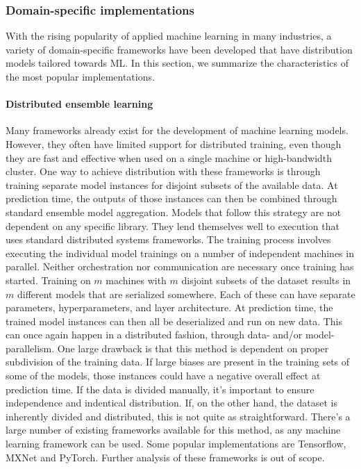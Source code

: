 \subsubsection{Domain-specific implementations}

With the rising popularity of applied machine learning in many industries, a variety of domain-specific frameworks have been developed that have distribution models tailored towards ML. In this section, we summarize the characteristics of the most popular implementations.

\paragraph{Distributed ensemble learning}
Many frameworks already exist for the development of machine learning models. However, they often have limited support for distributed training, even though they are fast and effective when used on a single machine or high-bandwidth cluster. One way to achieve distribution with these frameworks is through training separate model instances for disjoint subsets of the available data. At prediction time, the outputs of those instances can then be combined through standard ensemble model aggregation\citep{Opitz1999}.
Models that follow this strategy are not dependent on any specific library. They lend themselves well to execution that uses standard distributed systems frameworks. The training process involves executing the individual model trainings on a number of independent machines in parallel. Neither orchestration nor communication are necessary once training has started. Training on $m$ machines with $m$ disjoint subsets of the dataset results in $m$ different models that are serialized somewhere. Each of these can have separate parameters, hyperparameters, and layer architecture. At prediction time, the trained model instances can then all be deserialized and run on new data. This can once again happen in a distributed fashion, through data- and/or model-parallelism.
One large drawback is that this method is dependent on proper subdivision of the training data. If large biases are present in the training sets of some of the models, those instances could have a negative overall effect at prediction time. If the data is divided manually, it's important to ensure independence and indentical distribution. If, on the other hand, the dataset is inherently divided and distributed, this is not quite as straightforward.
There's a large number of existing frameworks available for this method, as any machine learning framework can be used. Some popular implementations are Tensorflow\citep{Tensorflow2015}, MXNet\citep{MXNet2015} and PyTorch\citep{PyTorch2017}. Further analysis of these frameworks is out of scope.

